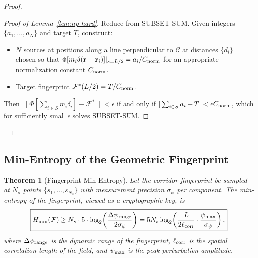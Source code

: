 \documentclass[twocolumn,superscriptaddress,prd,nofootinbib]{revtex4-2}
\newcommand{\Corridor}{\mathcal{C}}
\newcommand{\Fingerprint}{\mathcal{F}}
\newcommand{\Hmin}{H_{\min}}
\newtheorem{theorem}{Theorem}
\begin{document}
\begin{proof}
\begin{proof}[Proof of Lemma~\ref{lem:np-hard}]
Reduce from SUBSET-SUM. Given integers $\{a_1,\ldots,a_N\}$ and
target $T$, construct:
\begin{itemize}
\item $N$ sources at positions along a line perpendicular to $\Corridor$
at distances $\{d_i\}$ chosen so that
$\Phi[m_i\delta(\mathbf{r}-\mathbf{r}_i)]|_{s=L/2} = a_i/C_{\rm norm}$
for an appropriate normalization constant $C_{\rm norm}$.
\item Target fingerprint
$\Fingerprint^*(L/2) = T/C_{\rm norm}$.
\end{itemize}
Then $\|\Phi[\sum_{i\in S}m_i\delta_i] - \Fingerprint^*\| < \epsilon$
if and only if $|\sum_{i\in S}a_i - T| < \epsilon C_{\rm norm}$,
which for sufficiently small $\epsilon$ solves SUBSET-SUM.
\end{proof}
\end{proof}

\subsection{Min-Entropy of the Geometric Fingerprint}

\begin{theorem}[Fingerprint Min-Entropy]\label{thm:min-entropy}
Let the corridor fingerprint be sampled at $N_s$ points
$\{s_1,\ldots,s_{N_s}\}$ with measurement precision $\sigma_\psi$
per component. The min-entropy of the fingerprint, viewed as a
cryptographic key, is
\begin{equation}
\boxed{
\Hmin(\Fingerprint) \geq N_s \cdot 5 \cdot
\log_2\!\left(\frac{\Delta\psi_{\rm range}}{2\sigma_\psi}\right)
= 5 N_s \log_2\!\left(\frac{L}{2\ell_{\rm corr}}\cdot
\frac{\psi_{\rm max}}{\sigma_\psi}\right),
}
\label{eq:min-entropy}
\end{equation}
where $\Delta\psi_{\rm range}$ is the dynamic range of the fingerprint,
$\ell_{\rm corr}$ is the spatial correlation length of the field, and
$\psi_{\rm max}$ is the peak perturbation amplitude.
\end{theorem}
\end{document}
